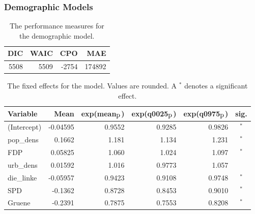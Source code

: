 \subsubsection{Demographic Models}
\begin{table}[H] 
\caption{The performance measures for the demographic model. \label{demoGermany_nospatial}}
\begin{tabular}{r r r r}
\toprule\textbf{DIC}	& \textbf{WAIC} & \textbf{CPO} & \textbf{MAE}\\
\midrule
5508 & 5509 & -2754 & 174892 \\
\bottomrule
\end{tabular}
\end{table} 
\begin{table}[H]
\caption{The fixed effects for the model. Values are rounded. A $^*$ denotes a significant effect. \label{fixedDemoGermany_nospatial}}
\begin{tabular}{l r r r r c}
\toprule
\textbf{Variable}	& \textbf{Mean}	& \textbf{exp(mean$_{\hbox{p}}$)} & \textbf{exp(q0025$_{\hbox{p}}$)} & \textbf{exp(q0975$_{\hbox{p}}$)} & \textbf{sig.}\\
\midrule
(Intercept) & -0.04595 & 0.9552 & 0.9285 & 0.9826 & $^*$\\
pop\_dens & 0.1662 & 1.181& 1.134 & 1.231 &$^*$\\
FDP & 0.05825 & 1.060& 1.024 & 1.097 &$^*$\\
urb\_dens & 0.01592 & 1.016 & 0.9773& 1.057 &\\
die\_linke & -0.05957 & 0.9423 & 0.9108 & 0.9748 & $^*$\\
SPD & -0.1362 & 0.8728 & 0.8453 & 0.9010 & $^*$\\
Gruene & -0.2391 & 0.7875 & 0.7553 & 0.8208 & $^*$\\
\bottomrule
\end{tabular}
\end{table}
